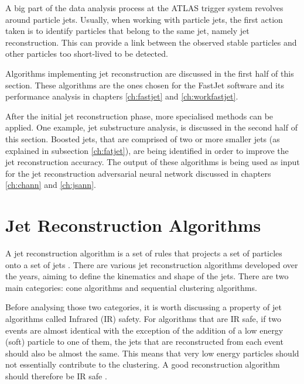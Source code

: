 A big part of the data analysis process at the ATLAS trigger system revolves around particle jets. Usually, when working with particle jets, the first action taken is to identify particles that belong to the same jet, namely jet reconstruction. This can provide a link between the observed stable particles and other particles too short-lived to be detected.


Algorithms implementing jet reconstruction are discussed in the first half of this section. These algorithms are the ones chosen for the FastJet software and its performance analysis in chapters \ref{ch:fastjet} and \ref{ch:workfastjet}.  

After the initial jet reconstruction phase, more specialised methods can be applied. One example, jet substructure analysis, is discussed in the second half of this section. Boosted jets, that are comprised of two or more smaller jets (as explained in subsection \ref{ch:fatjet}), are being identified in order to improve the jet reconstruction accuracy. The output of these algorithms is being used as input for the jet reconstruction adversarial neural network discussed in chapters \ref{ch:chann} and \ref{ch:jsann}.


\section{Jet Reconstruction Algorithms}\label{ch:seq_alg}
    A jet reconstruction algorithm is a set of rules that projects a set of particles onto a set of jets \cite{cacciari2012fastjet}. There are various jet reconstruction algorithms developed over the years, aiming to define the kinematics and shape of the jets. There are two main categories: cone algorithms and sequential clustering algorithms.

    Before analysing those two categories, it is worth discussing a property of jet algorithms called Infrared (IR) safety. For algorithms that are IR safe, if two events are almost identical with the exception of the addition of a low energy (soft) particle to one of them, the jets that are reconstructed from each event should also be almost the same. This means that very low energy particles should not essentially contribute to the clustering. A good reconstruction algorithm should therefore be IR safe \cite{algorithms_irc}.%
    
